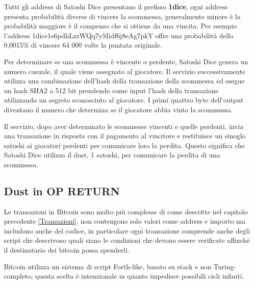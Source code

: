 Tutti gli address di Satoshi Dice presentano il prefisso \textbf{1dice}, ogni address presenta probabilità diverse di vincere la scommessa, generalmente minore è la probabilità maggiore è il compenso che si ottiene da una vincita. Per esempio l'address 1dice1e6pdhLzzWQq7yMidf6j8eAg7pkY offre una probabilità dello 0,0015\% di vincere 64 000 volte la puntata originale.

Per determinare se una scommessa è vincente o perdente, Satoshi Dice genera un numero casuale, il quale viene assegnato al giocatore. Il servizio successivamente utilizza una combinazione dell'hash della transazione della scommessa ed esegue un hash SHA2 a 512 bit prendendo come input l'hash della transazione utilizzando un segreto sconosciuto al giocatore. I primi quattro byte dell'output diventano il numero che determina se il giocatore abbia vinto la scommessa.

Il servizio, dopo aver determinato le scommesse vincenti e quelle perdenti, invia una transazione in risposta con il pagamento al vincitore e restituisce un sinoglo satoshi ai giocatori perdenti per comunicare loro la perdita. Questo significa che Satoshi Dice utilizza il dust, 1 satoshi, per comunicare la perdita di una scommessa.
\subsection{Dust in OP RETURN}
Le transazioni in Bitcoin sono molto più complesse \cite{script} di come descritte nel capitolo precedente \ref{Transazioni}, non contengono solo valori come address e importo ma includono anche del codice, in particolare ogni transazione comprende anche degli script che descrivono quali siano le condizioni che devono essere verificate affinchè il destinatario dei bitcoin possa spenderli. 

Bitcoin utilizza un sistema di script Forth-like, basato su stack e non Turing-completo; questa scelta è intenzionale in quanto impedisce possibili cicli infiniti. 

